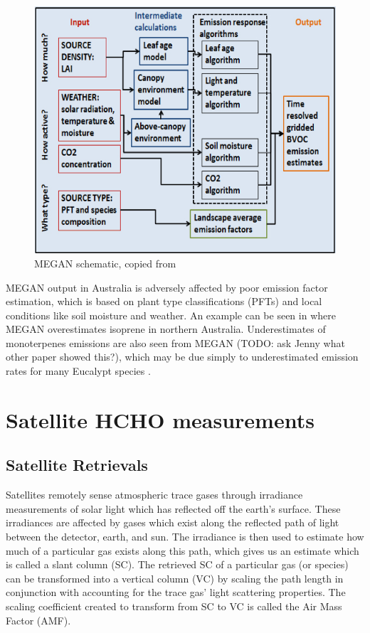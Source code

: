     \begin{figure}[!htbp]
      \includegraphics[width=\textwidth]{Figures/MEGANmodel_img.jpg}
      \caption{MEGAN schematic, copied from \citet{Megan_Website}}
      \label{ch_HCHO:fig:megan_schematic}
    \end{figure}

    MEGAN output in Australia is adversely affected by poor emission factor estimation, which is based on plant type classifications (PFTs) and local conditions like soil moisture and weather. 
    An example can be seen in \citet{Muller2008} where MEGAN overestimates isoprene in northern Australia.
    Underestimates of monoterpenes emissions are also seen from MEGAN (TODO: ask Jenny what other paper showed this?), which may be due simply to underestimated emission rates for many Eucalypt species \citep{Winters2009}.
    

\section{Satellite HCHO measurements}
\label{ch_HCHO:sec:satelliteHCHO}
  \subsection{Satellite Retrievals}
    Satellites remotely sense atmospheric trace gases through irradiance measurements of solar light which has reflected off the earth's surface. 
    These irradiances are affected by gases which exist along the reflected path of light between the detector, earth, and sun. 
    The irradiance is then used to estimate how much of a particular gas exists along this path, which gives us an estimate which is called a slant column (SC).
    The retrieved SC of a particular gas (or species) can be transformed into a vertical column (VC) by scaling the path length in conjunction with accounting for the trace gas' light scattering properties.
    The scaling coefficient created to transform from SC to VC is called the Air Mass Factor (AMF).

